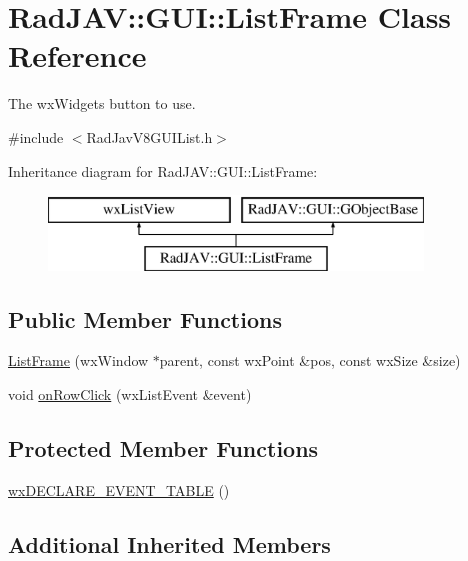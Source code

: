 \hypertarget{class_rad_j_a_v_1_1_g_u_i_1_1_list_frame}{}\section{Rad\+J\+AV\+:\+:G\+UI\+:\+:List\+Frame Class Reference}
\label{class_rad_j_a_v_1_1_g_u_i_1_1_list_frame}


The wx\+Widgets button to use.  




{\ttfamily \#include $<$Rad\+Jav\+V8\+G\+U\+I\+List.\+h$>$}

Inheritance diagram for Rad\+J\+AV\+:\+:G\+UI\+:\+:List\+Frame\+:\begin{figure}[H]
\begin{center}
\leavevmode
\includegraphics[height=2.000000cm]{class_rad_j_a_v_1_1_g_u_i_1_1_list_frame}
\end{center}
\end{figure}
\subsection*{Public Member Functions}
\begin{DoxyCompactItemize}
\item 
\mbox{\hyperlink{class_rad_j_a_v_1_1_g_u_i_1_1_list_frame_a21e140af7f551a97e48fda6a2b0dcd63}{List\+Frame}} (wx\+Window $\ast$parent, const wx\+Point \&pos, const wx\+Size \&size)
\item 
void \mbox{\hyperlink{class_rad_j_a_v_1_1_g_u_i_1_1_list_frame_a3a93f46babd9e2ad84aeb8ba6a703d09}{on\+Row\+Click}} (wx\+List\+Event \&event)
\end{DoxyCompactItemize}
\subsection*{Protected Member Functions}
\begin{DoxyCompactItemize}
\item 
\mbox{\hyperlink{class_rad_j_a_v_1_1_g_u_i_1_1_list_frame_a2a3365a43d24428c99fb4bb315650235}{wx\+D\+E\+C\+L\+A\+R\+E\+\_\+\+E\+V\+E\+N\+T\+\_\+\+T\+A\+B\+LE}} ()
\end{DoxyCompactItemize}
\subsection*{Additional Inherited Members}


